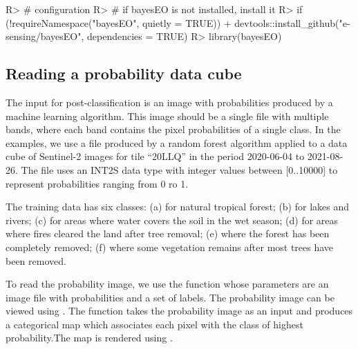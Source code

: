 \documentclass[
  shortnames]{jss}
\begin{document}
\begin{CodeChunk}
\begin{CodeInput}
R> # configuration 
R> # if bayesEO is not installed, install it
R> if (!requireNamespace("bayesEO", quietly = TRUE))
+     devtools::install_github("e-sensing/bayesEO", dependencies = TRUE)
R> library(bayesEO)
\end{CodeInput}
\end{CodeChunk}

\subsection{Reading a probability data cube}\label{reading-a-probability-data-cube}

The input for post-classification is an image with probabilities produced by a machine learning algorithm. This image should be a single file with multiple bands, where each band contains the pixel probabilities of a single class. In the examples, we use a file produced by a random forest algorithm applied to a data cube of Sentinel-2 images for tile ``20LLQ'' in the period 2020-06-04 to 2021-08-26. The file uses an INT2S data type with integer values between {[}0..10000{]} to represent probabilities ranging from 0 ro 1.

The training data has six classes: (a)  for natural tropical forest; (b)  for lakes and rivers; (c)  for areas where water covers the soil in the wet season; (d)  for areas where fires cleared the land after tree removal; (e)  where the forest has been completely removed; (f)  where some vegetation remains after most trees have been removed.

To read the probability image, we use the function  whose parameters are an image file with probabilities and a set of labels. The probability image can be viewed using . The function  takes the probability image as an input and produces a categorical map which associates each pixel with the class of highest probability.The map is rendered using .
\end{document}
